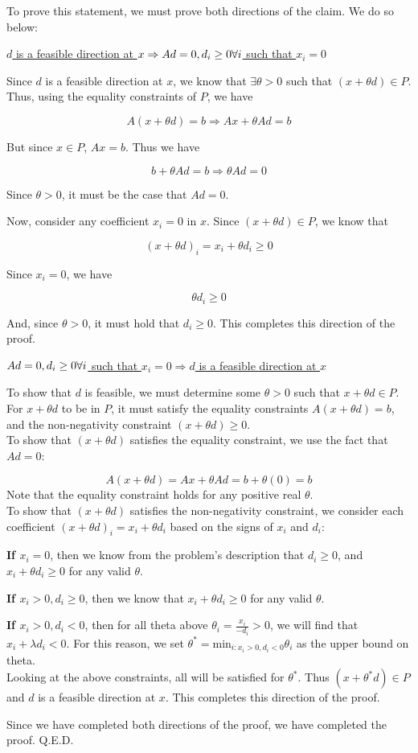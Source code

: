 \documentclass[11pt]{article}
\begin{document}
To prove this statement, we must prove both directions of the claim. We do so below:

\underline{$d$ is a feasible direction at $x\Rightarrow Ad=0, d_i\geq 0\space\forall i$ such that $x_i=0$}

Since $d$ is a feasible direction at $x$, we know that $\exists \theta>0$ such that $(x+\theta d)\in P$. Thus, using the equality constraints of $P$, we have

$$
A(x+\theta d) = b \Rightarrow Ax + \theta Ad = b
$$

But since $x\in P$, $Ax=b$. Thus we have

$$
b + \theta Ad = b \Rightarrow \theta Ad = 0
$$

Since $\theta>0$, it must be the case that $Ad=0$.

Now, consider any coefficient $x_i=0$ in $x$. Since $(x+\theta d)\in P$, we know that 

$$
(x+\theta d)_i = x_i + \theta d_i \geq 0
$$

Since $x_i=0$, we have

$$
\theta d_i \geq 0
$$

And, since $\theta>0$, it must hold that $d_i\geq 0$. This completes this direction of the proof.

\underline{$Ad=0, d_i\geq 0\space\forall i$ such that $x_i=0\Rightarrow d$ is a feasible direction at $x$}

To show that $d$ is feasible, we must determine some $\theta>0$ such that $x+\theta d\in P$. For $x+\theta d$ to be in $P$, it must satisfy the equality constraints $A(x+\theta d) = b$, and the non-negativity constraint $(x+\theta d)\geq 0$.\\

To show that $(x+\theta d)$ satisfies the equality constraint, we use the fact that $Ad=0$:

$$
A(x+\theta d) = Ax + \theta Ad = b + \theta(0)=b
$$
Note that the equality constraint holds for any positive real $\theta$.\\

To show that $(x+\theta d)$ satisfies the non-negativity constraint, we consider each coefficient $(x+\theta d)_i=x_i+\theta d_i$ based on the signs of $x_i$ and $d_i$:

\textbf{If $x_i = 0$}, then we know from the problem's description that $d_i\geq 0$, and $x_i+\theta d_i\geq 0$ for any valid $\theta$.

\textbf{If $x_i>0, d_i\geq 0$}, then we know that $x_i+\theta d_i\geq 0$ for any valid $\theta$.

\textbf{If $x_i>0, d_i<0$}, then for all theta above $\theta_i=\frac{x_i}{-d_i}>0$, we will find that $x_i+\lambda d_i<0$. For this reason, we set $\theta^*=\text{min}_{i: x_i>0, d_i<0} \theta_i$ as the upper bound on theta.\\

Looking at the above constraints, all will be satisfied for $\theta^*$. Thus $(x+\theta^*d)\in P$ and $d$ is a feasible direction at $x$. This completes this direction of the proof.

Since we have completed both directions of the proof, we have completed the proof. Q.E.D.
\end{document}
